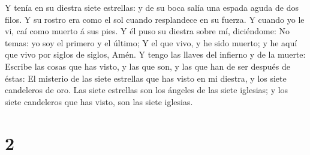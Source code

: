  Y tenía en su diestra siete estrellas: y de su boca
salía una espada aguda de dos filos. Y su rostro era como el sol cuando
resplandece en su fuerza.  Y cuando yo le vi, caí como
muerto á sus pies. Y él puso su diestra sobre mí, diciéndome: No temas:
yo soy el primero y el último;  Y el que vivo, y he sido
muerto; y he aquí que vivo por siglos de siglos, Amén. Y tengo las
llaves del infierno y de la muerte:  Escribe las cosas
que has visto, y las que son, y las que han de ser después de éstas:
 El misterio de las siete estrellas que has visto en mi
diestra, y los siete candeleros de oro. Las siete estrellas son los
ángeles de las siete iglesias; y los siete candeleros que has visto, son
las siete iglesias.

\hypertarget{section-1}{%
\section{2}\label{section-1}}

